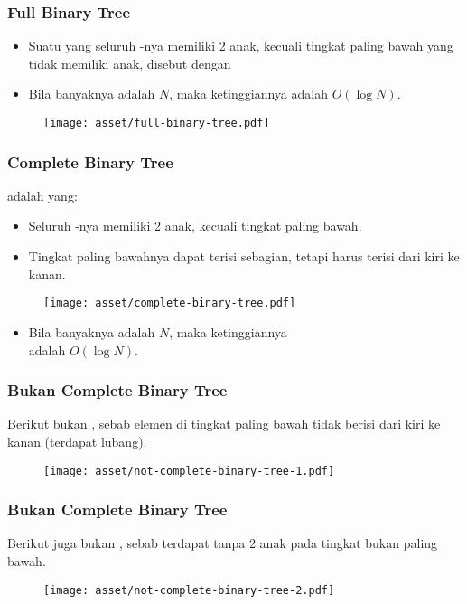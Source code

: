 \begin{frame}
\frametitle{Full Binary Tree}
\begin{itemize}
  \item Suatu  yang seluruh \fnode-nya memiliki 2 anak, kecuali tingkat paling bawah yang tidak memiliki anak, disebut dengan 
  \item Bila banyaknya \fnode adalah $N$, maka ketinggiannya adalah $O(\log{N})$.
\end{itemize}
\begin{figure}
  \texttt{[image: asset/full-binary-tree.pdf]}
\end{figure}
\end{frame}

\begin{frame}
\frametitle{Complete Binary Tree}
 adalah  yang:
\begin{itemize}
  \item Seluruh \fnode-nya memiliki 2 anak, kecuali tingkat paling bawah.
  \item Tingkat paling bawahnya dapat terisi sebagian, tetapi harus terisi dari kiri ke kanan.
\end{itemize}
\begin{figure}
  \texttt{[image: asset/complete-binary-tree.pdf]}
\end{figure}
\begin{itemize}
  \item Bila banyaknya \fnode adalah $N$, maka ketinggiannya \\ adalah $O(\log{N})$.
\end{itemize}
\end{frame}

\begin{frame}
\frametitle{Bukan Complete Binary Tree}
Berikut bukan , sebab elemen di tingkat paling bawah tidak berisi dari kiri ke kanan (terdapat lubang).
\begin{figure}
  \texttt{[image: asset/not-complete-binary-tree-1.pdf]}
\end{figure}
\end{frame}

\begin{frame}
\frametitle{Bukan Complete Binary Tree}
Berikut juga bukan , sebab terdapat \fnode tanpa 2 anak pada tingkat bukan paling bawah.
\begin{figure}
  \texttt{[image: asset/not-complete-binary-tree-2.pdf]}
\end{figure}
\end{frame}

